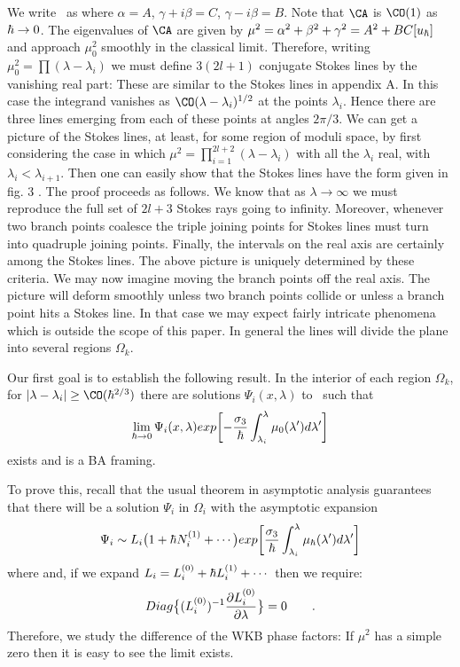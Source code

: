 We write \wkay\ as
\eqn{}
where $\alpha=A$, $\gamma+i\beta=C$, $\gamma-i\beta=B$. 
Note that $\CA$ is $\CO(1)$ as $\hbar\to 0$. The eigenvalues of 
$\CA$ are given by $\mu^2=\alpha^2+\beta^2+\gamma^2=A^2+BC[u_\hbar]$
and approach $\mu_0^2$ smoothly in the classical limit.
Therefore, writing $\mu_0^2=\prod(\lambda-\lambda_i)$ we must define 
$3(2l+1)$ conjugate Stokes lines by the vanishing real part:
\eqn{}
These are similar to the Stokes lines in appendix A. 
In this case the integrand vanishes as 
$\CO(\lambda-\lambda_i)^{1/2}$
at the points $\lambda_i$. Hence there are three lines 
emerging from each of these points at angles $2\pi/3$. 
We can get a picture
of the Stokes lines, at least, for some region of 
moduli space, by first considering the case in which 
$\mu^2=\prod_{i=1}^{2l+2}(\lambda-\lambda_i)$ with all the 
$\lambda_i$ real, with $\lambda_i<\lambda_{i+1}$. 
Then one can easily show that the Stokes lines 
have the form given in fig. 3 . The proof 
proceeds as follows. We know that as $\lambda\to \infty$ 
we must reproduce the full set of $2l+3$ Stokes rays 
going to infinity. Moreover, whenever two branch points
coalesce the triple joining points for Stokes lines 
must turn into quadruple joining points. Finally, 
the intervals on the real axis are certainly among 
the Stokes lines. The above picture is uniquely determined
by these criteria.
We may now imagine moving the branch points off the real 
axis. The picture will deform smoothly unless two branch 
points collide or unless a branch point hits a Stokes 
line. In that case we may expect fairly intricate 
phenomena which is outside the scope of this paper.
In general the lines will divide the plane into several
regions $\Omega_k$. 

Our first goal is to establish the following result.
In the interior of each region
$\Omega_k$, for $|\lambda-\lambda_i|\geq\CO(\hb^{2/3})$ 
there are solutions $\Psi_i(x,\lambda)$ to \compa\ 
such that 
$$\lim_{\hbar\to 0}\Psi_i(x,\lambda)
exp\biggl[-
{\sigma_3\over\hbar}\int^\lambda_{\lambda_i}\mu_0
(\lambda')d\lambda'\biggl]
$$
exists and is a BA framing. 

To prove this, recall that the usual theorem in asymptotic 
analysis guarantees that there will be a solution $\Psi_i$ in 
$\Omega_i$ with the asymptotic expansion
$$\Psi_i\sim L_i\bigl(1 + \hbar N^{(1)}_i+\cdots\bigr)
exp\biggl[
{\sigma_3\over\hbar}\int^\lambda_{\lambda_i}\mu_\hbar
(\lambda')d\lambda'\biggl]$$
where 
\eqn{}
and, if we expand
$L_i=L_i^{(0)}+\hbar L_i^{(1)}+\cdots$ then we require:
$$Diag\bigl\{(L_i^{(0)})^{-1}{\partial L_i^{(0)}\over\partial 
\lambda}\bigr\}=0 \qquad .$$
Therefore, we study the difference of the WKB phase factors:
\eqn{}
If $\mu^2$ has a simple zero then it is easy to see the limit
exists. 

